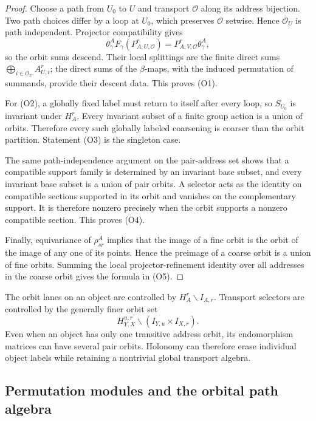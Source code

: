 \begin{proof}
Choose a path from \(U_0\) to \(U\) and transport \(\mathcal O\) along its
address bijection.  Two path choices differ by a loop at \(U_0\), which
preserves \(\mathcal O\) setwise.  Hence \(\mathcal O_U\) is path independent.
Projector compatibility gives
\[
 \theta^A_\gamma F_\gamma(P^r_{A,U,\mathcal O})
 =
 P^r_{A,V,\mathcal O}\theta^A_\gamma,
\]
so the orbit sums descend.  Their local splittings are the finite direct sums
\(\bigoplus_{i\in\mathcal O_U}A^r_{U,i}\); the direct sums of the \(\beta\)-maps,
with the induced permutation of summands, provide their descent data.  This
proves (O1).

For (O2), a globally fixed label must return to itself after every loop, so
\(S_{U_0}\) is invariant under \(H_A^r\).  Every invariant subset of a finite
group action is a union of orbits.  Therefore every such globally labeled
coarsening is coarser than the orbit partition.  Statement (O3) is the
singleton case.

The same path-independence argument on the pair-address set shows that a
compatible support family is determined by an invariant base subset, and every
invariant base subset is a union of pair orbits.  A selector acts as the
identity on compatible sections supported in its orbit and vanishes on the
complementary support.  It is therefore nonzero precisely when the orbit
supports a nonzero compatible section.  This proves (O4).

Finally, equivariance of \(\rho^A_{sr}\) implies that the image of a fine orbit
is the orbit of the image of any one of its points.  Hence the preimage of a
coarse orbit is a union of fine orbits.  Summing the local projector-refinement
identity over all addresses in the coarse orbit gives the formula in (O5).
\end{proof}

\begin{remark}
\label{rem:block16-object-vs-pair-orbits}
The orbit lanes on an object are controlled by \(H_A^r\backslash I_{A,r}\).
Transport selectors are controlled by the generally finer orbit set
\[
 H_{Y,X}^{u,r}\backslash
 \left(I_{Y,u}\times I_{X,r}\right).
\]
Even when an object has only one transitive address orbit, its endomorphism
matrices can have several pair orbits.  Holonomy can therefore erase individual
object labels while retaining a nontrivial global transport algebra.
\end{remark}

\subsection{Permutation modules and the orbital path algebra}
\label{subsec:block16-permutation-orbital-calculus}

